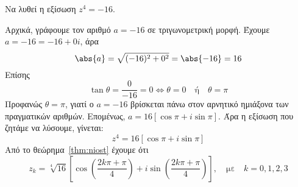 \begin{mybox3}
  \begin{example}
    Να λυθεί η εξίσωση $ z^{4} = -16 $. 
  \end{example}
\end{mybox3}
\begin{solution}
  Αρχικά, γράφουμε τον αριθμό $ a = -16 $ σε τριγωνομετρική μορφή. Έχουμε 
  $ a=-16=-16+0i $, άρα 
  \[ 
    \abs{a} = \sqrt{(-16)^{2}+0^2} = \abs{-16} = 16 
  \] 
  Επίσης
  \[
    \tan{\theta} = \frac{0}{-16} = 0 \Leftrightarrow \theta =0 \quad
    \text{ή} \quad \theta = \pi
  \] 
  Προφανώς $ \theta = \pi $, γιατί ο $a=-16$ βρίσκεται πάνω στον αρνητικό 
  ημιάξονα των πραγματικών αριθμών. Επομένως, $ a = 16[\cos{\pi} + i
  \sin{\pi}] $. Άρα η εξίσωση που ζητάμε να λύσουμε, γίνεται:
  \[
    z^{4} = 16 [\cos{\pi} + i \sin{\pi}] 
  \] 
  Από το θεώρημα~\ref{thm:niost} έχουμε ότι
  \[
    z_{k} = \sqrt[4]{16} \left[\cos{\left(\frac{2k \pi + \pi}{4}\right)} + i
    \sin{\left(\frac{2k \pi + \pi}{ 4}\right)}\right], 
    \quad \text{με} \quad k=0,1,2,3
  \] 


\end{solution}




